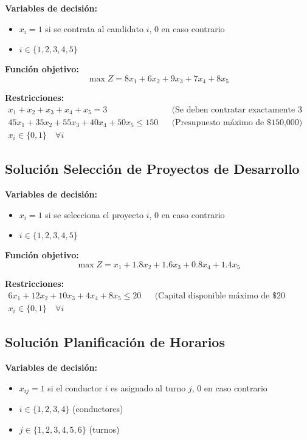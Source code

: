 \documentclass[12pt]{article}
\begin{document}
\textbf{Variables de decisión:}
\begin{itemize}
    \item $x_i = 1$ si se contrata al candidato $i$, 0 en caso contrario
    \item $i \in \{1, 2, 3, 4, 5\}$
\end{itemize}

\textbf{Función objetivo:}
$$\max Z = 8x_1 + 6x_2 + 9x_3 + 7x_4 + 8x_5$$

\textbf{Restricciones:}
\begin{align*}
    x_1 + x_2 + x_3 + x_4 + x_5 = 3 && \text{(Se deben contratar exactamente 3 empleados)} \\
    45x_1 + 35x_2 + 55x_3 + 40x_4 + 50x_5 \leq 150 && \text{(Presupuesto máximo de \$150,000)} \\
    x_i \in \{0,1\} \quad \forall i
\end{align*}

\subsection{Solución Selección de Proyectos de Desarrollo}

\textbf{Variables de decisión:}
\begin{itemize}
    \item $x_i = 1$ si se selecciona el proyecto $i$, 0 en caso contrario
    \item $i \in \{1, 2, 3, 4, 5\}$
\end{itemize}

\textbf{Función objetivo:}
$$\max Z = x_1 + 1.8x_2 + 1.6x_3 + 0.8x_4 + 1.4x_5$$

\textbf{Restricciones:}
\begin{align*}
    6x_1 + 12x_2 + 10x_3 + 4x_4 + 8x_5 \leq 20 && \text{(Capital disponible máximo de \$20 millones)} \\
    x_i \in \{0,1\} \quad \forall i
\end{align*}

\subsection{Solución Planificación de Horarios}

\textbf{Variables de decisión:}
\begin{itemize}
    \item $x_{ij} = 1$ si el conductor $i$ es asignado al turno $j$, 0 en caso contrario
    \item $i \in \{1, 2, 3, 4\}$ (conductores)
    \item $j \in \{1, 2, 3, 4, 5, 6\}$ (turnos)
\end{itemize}
\end{document}
